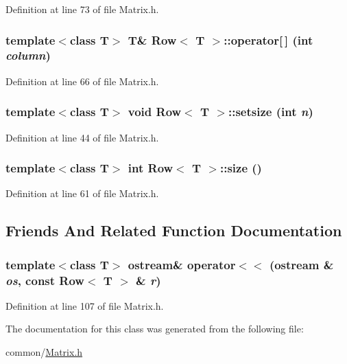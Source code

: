 Definition at line 73 of file Matrix.h.

\hypertarget{classRow_a7f371e29268ff2a5e508b32229250d8d}{
\subsubsection[{operator[]}]{\setlength{\rightskip}{0pt plus 5cm}template$<$class T$>$ T\& {\bf Row}$<$ T $>$::operator\mbox{[}$\,$\mbox{]} (int {\em column})}}
\label{classRow_a7f371e29268ff2a5e508b32229250d8d}


Definition at line 66 of file Matrix.h.

\hypertarget{classRow_aebdf0fa4ce1946b8d9ef3c6f266edb7d}{
\subsubsection[{setsize}]{\setlength{\rightskip}{0pt plus 5cm}template$<$class T$>$ void {\bf Row}$<$ T $>$::setsize (int {\em n})}}
\label{classRow_aebdf0fa4ce1946b8d9ef3c6f266edb7d}


Definition at line 44 of file Matrix.h.

\hypertarget{classRow_ac3239fe892db0029206a7e0d888595d1}{
\subsubsection[{size}]{\setlength{\rightskip}{0pt plus 5cm}template$<$class T$>$ int {\bf Row}$<$ T $>$::size ()}}
\label{classRow_ac3239fe892db0029206a7e0d888595d1}


Definition at line 61 of file Matrix.h.



\subsection{Friends And Related Function Documentation}
\hypertarget{classRow_a8aaaee73ace04bfd4dda937bc311a16e}{
\subsubsection[{operator$<$$<$}]{\setlength{\rightskip}{0pt plus 5cm}template$<$class T$>$ ostream\& operator$<$$<$ (ostream \& {\em os}, \/  const {\bf Row}$<$ T $>$ \& {\em r})}}
\label{classRow_a8aaaee73ace04bfd4dda937bc311a16e}


Definition at line 107 of file Matrix.h.



The documentation for this class was generated from the following file:\begin{DoxyCompactItemize}
\item 
common/\hyperlink{Matrix_8h}{Matrix.h}\end{DoxyCompactItemize}
